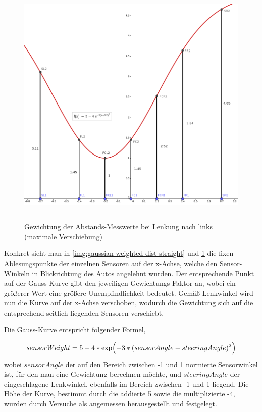 \documentclass[12pt, a4paper]{scrartcl}
\begin{document}
\begin{figure}[ht]
	\centering
	\includegraphics[width=\textwidth, height=12cm, keepaspectratio]{Bilder/Gauss_Sensorgewichtung_geneigt.png}
	\caption{Gewichtung der Abstands-Messwerte bei Lenkung nach links (maximale Verschiebung)}
	\label{img:gaussian-weighted-dist-curve}
\end{figure}

Konkret sieht man in \autoref{img:gaussian-weighted-dist-straight} und \ref{img:gaussian-weighted-dist-curve} die fixen Ablesungspunkte der einzelnen Sensoren auf der x-Achse, welche den Sensor-Winkeln in Blickrichtung des Autos angelehnt wurden. Der entsprechende Punkt auf der Gauss-Kurve gibt den jeweiligen Gewichtungs-Faktor an, wobei ein größerer Wert eine größere Unempfindlichkeit bedeutet. Gemäß Lenkwinkel wird nun die Kurve auf der x-Achse verschoben, wodurch die Gewichtung sich auf die entsprechend seitlich liegenden Sensoren verschiebt.

Die Gauss-Kurve entspricht folgender Formel,

\begin{equation}\label{eq:gaussian-weighted-dist}
sensorWeight= 5 - 4 * \exp\Bigl({-3 * (sensorAngle - steeringAngle)^2}\Bigr)
\end{equation}
wobei $sensorAngle$ der auf den Bereich zwischen -1 und 1 normierte Sensorwinkel ist, für den man eine Gewichtung berechnen möchte, und $steeringAngle$ der eingeschlagene Lenkwinkel, ebenfalls im Bereich zwischen -1 und 1 liegend. Die Höhe der Kurve, bestimmt durch die addierte 5 sowie die multiplizierte -4, wurden durch Versuche als angemessen herausgestellt und festgelegt.
\end{document}
